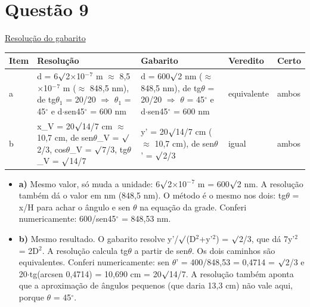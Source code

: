 \documentclass{article}%
\begin{document}
\section*{Questão 9}%
\href{https://poliedroresolve.sistemapoliedro.com.br/vestibulares/ita/2026/ita-2-fase-dia-3-30-10-2025-2-fase-dia-3/dissertativa-9-fisica-2-fase-dia-3-ita-2026}{Resolução do gabarito}\par\smallskip%
\begin{longtable}{@{}p{} p{} p{} p{} p{}@{}}\toprule Item & Resolução & Gabarito & Veredito & Certo \\ \midrule
a & d = 6$\surd$2$\times$10$^{-}$$^{7}$ m $\approx$ 8,5$\times$10$^{-}$$^{7}$ m ($\approx$ 848,5 nm), de tg$\theta$$_{1}$ = 20/20 $\Rightarrow$ $\theta$$_{1}$ = 45$^\circ$ e d$\cdot$sen45$^\circ$ = 600 nm & d = 600$\surd$2 nm ($\approx$ 848,5 nm), de tg$\theta$ = 20/20 $\Rightarrow$ $\theta$ = 45$^\circ$ e d$\cdot$sen45$^\circ$ = 600 nm & equivalente & ambos \\
b & x\_V = 20$\surd$14/7 cm $\approx$ 10,7 cm, de sen$\theta$\_V = $\surd$2/3, cos$\theta$\_V = $\surd$7/3, tg$\theta$\_V = $\surd$14/7 & y' = 20$\surd$14/7 cm ($\approx$ 10,7 cm), de sen$\theta$' = $\surd$2/3 & igual & ambos \\
\bottomrule\end{longtable}%
\begin{itemize}%
\item%
\textbf{a)} Mesmo valor, só muda a unidade: 6$\surd$2$\times$10$^{-}$$^{7}$ m = 600$\surd$2 nm. A resolução também dá o valor em nm (848,5 nm). O método é o mesmo nos dois: tg$\theta$ = x/H para achar o ângulo e sen $\theta$ na equação da grade. Conferi numericamente: 600/sen45$^\circ$ = 848,53 nm.%
\item%
\textbf{b)} Mesmo resultado. O gabarito resolve y'/$\surd$(D$^2$+y'$^2$) = $\surd$2/3, que dá 7y'$^2$ = 2D$^2$. A resolução calcula tg$\theta$ a partir de sen$\theta$. Os dois caminhos são equivalentes. Conferi numericamente: sen $\theta$' = 400/848,53 = 0,4714 = $\surd$2/3 e 20$\cdot$tg(arcsen 0,4714) = 10,690 cm = 20$\surd$14/7. A resolução também aponta que a aproximação de ângulos pequenos (que daria 13,3 cm) não vale aqui, porque $\theta$ = 45$^\circ$.%
\end{itemize}%
\end{document}
